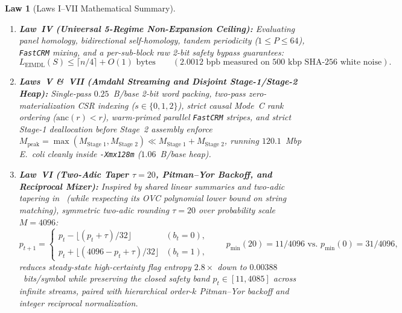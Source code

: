 \documentclass[10pt]{article}
\newtheorem{law}{Law}
\begin{document}
\begin{law}[Laws I--VII Mathematical Summary]
\begin{enumerate}
  \item \textbf{Law~IV (Universal 5-Regime Non-Expansion Ceiling):} Evaluating panel homology, bidirectional self-homology, tandem periodicity ($1 \le P \le 64$), \texttt{FastCRM} mixing, and a per-sub-block raw 2-bit safety bypass guarantees:
  \begin{equation}
    L_{\text{EIMDL}}(S) \le \lceil n/4 \rceil + O(1)\text{ bytes} \qquad (2.0012\text{ bpb measured on } 500\text{ kbp SHA-256 white noise}).
  \end{equation}
  \item \textbf{Laws~V \&~VII (Amdahl Streaming and Disjoint Stage-1/Stage-2 Heap):} Single-pass $0.25$~B/base 2-bit word packing, two-pass zero-materialization CSR indexing ($s \in \{0,1,2\}$), strict causal Mode~C rank ordering ($\text{anc}(r) < r$), warm-primed parallel \texttt{FastCRM} stripes, and strict Stage-1 deallocation before Stage~2 assembly enforce $M_{\text{peak}} = \max(M_{\text{Stage~1}}, M_{\text{Stage~2}}) \ll M_{\text{Stage~1}} + M_{\text{Stage~2}}$, running $120.1$~Mbp \textit{E.~coli} cleanly inside \texttt{-Xmx128m} ($1.06$~B/base heap).
  \item \textbf{Law~VI (Two-Adic Taper $\tau=20$, Pitman--Yor Backoff, and Reciprocal Mixer):} Inspired by shared linear summaries and two-adic tapering in~\cite{openai2026eth} (while respecting its OVC polynomial lower bound on string matching), symmetric two-adic rounding $\tau=20$ over probability scale $M=4096$:
  \begin{equation}
    p_{t+1} = \begin{cases} p_t - \lfloor (p_t + \tau)/32 \rfloor & (b_t = 0), \\ p_t + \lfloor (4096 - p_t + \tau)/32 \rfloor & (b_t = 1), \end{cases} \qquad p_{\min}(20) = 11/4096 \text{ vs.\ } p_{\min}(0) = 31/4096,
  \end{equation}
  reduces steady-state high-certainty flag entropy $2.8\times$ down to $0.00388$~bits/symbol while preserving the closed safety band $p_t \in [11, 4085]$ across infinite streams, paired with hierarchical order-$k$ Pitman--Yor backoff and integer reciprocal normalization.
\end{enumerate}
\end{law}
\end{document}

